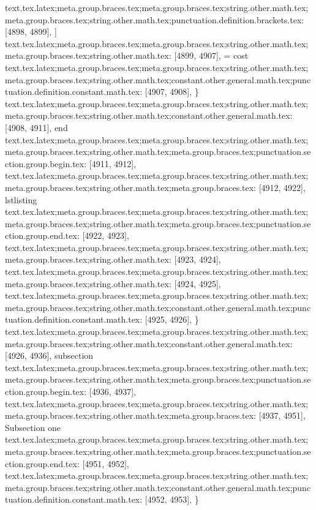 {{{{{{{{{{{{{{{{{{{{{{{{{{{{{{{{{{{{{{{{{{{{{{{{{{{{{{{{{{{{{{{{{{{{{{{{{{{{{{{{{{{{{{{{{{{{{{{{{{{{{{{{{{{{{{{{{{{{{{{{{{{{{{{{{{{{{{{{{{{{{{{{text.tex.latex;meta.group.braces.tex;meta.group.braces.tex;string.other.math.tex;meta.group.braces.tex;string.other.math.tex;punctuation.definition.brackets.tex: [4898, 4899], {]}
text.tex.latex;meta.group.braces.tex;meta.group.braces.tex;string.other.math.tex;meta.group.braces.tex;string.other.math.tex: [4899, 4907], { = cost
}
text.tex.latex;meta.group.braces.tex;meta.group.braces.tex;string.other.math.tex;meta.group.braces.tex;string.other.math.tex;constant.other.general.math.tex;punctuation.definition.constant.math.tex: [4907, 4908], {\}
text.tex.latex;meta.group.braces.tex;meta.group.braces.tex;string.other.math.tex;meta.group.braces.tex;string.other.math.tex;constant.other.general.math.tex: [4908, 4911], {end}
text.tex.latex;meta.group.braces.tex;meta.group.braces.tex;string.other.math.tex;meta.group.braces.tex;string.other.math.tex;meta.group.braces.tex;punctuation.section.group.begin.tex: [4911, 4912], {{}
text.tex.latex;meta.group.braces.tex;meta.group.braces.tex;string.other.math.tex;meta.group.braces.tex;string.other.math.tex;meta.group.braces.tex: [4912, 4922], {lstlisting}
text.tex.latex;meta.group.braces.tex;meta.group.braces.tex;string.other.math.tex;meta.group.braces.tex;string.other.math.tex;meta.group.braces.tex;punctuation.section.group.end.tex: [4922, 4923], {}}
text.tex.latex;meta.group.braces.tex;meta.group.braces.tex;string.other.math.tex;meta.group.braces.tex;string.other.math.tex: [4923, 4924], {
}
text.tex.latex;meta.group.braces.tex;meta.group.braces.tex;string.other.math.tex;meta.group.braces.tex;string.other.math.tex: [4924, 4925], {
}
text.tex.latex;meta.group.braces.tex;meta.group.braces.tex;string.other.math.tex;meta.group.braces.tex;string.other.math.tex;constant.other.general.math.tex;punctuation.definition.constant.math.tex: [4925, 4926], {\}
text.tex.latex;meta.group.braces.tex;meta.group.braces.tex;string.other.math.tex;meta.group.braces.tex;string.other.math.tex;constant.other.general.math.tex: [4926, 4936], {subsection}
text.tex.latex;meta.group.braces.tex;meta.group.braces.tex;string.other.math.tex;meta.group.braces.tex;string.other.math.tex;meta.group.braces.tex;punctuation.section.group.begin.tex: [4936, 4937], {{}
text.tex.latex;meta.group.braces.tex;meta.group.braces.tex;string.other.math.tex;meta.group.braces.tex;string.other.math.tex;meta.group.braces.tex: [4937, 4951], {Subsection one}
text.tex.latex;meta.group.braces.tex;meta.group.braces.tex;string.other.math.tex;meta.group.braces.tex;string.other.math.tex;meta.group.braces.tex;punctuation.section.group.end.tex: [4951, 4952], {}}
text.tex.latex;meta.group.braces.tex;meta.group.braces.tex;string.other.math.tex;meta.group.braces.tex;string.other.math.tex;constant.other.general.math.tex;punctuation.definition.constant.math.tex: [4952, 4953], {\}
}}}}}}}}}}}}}}}}}}}}}}}}}}}}}}}}}}}}}}}}}}}}}}}}}}}}}}}}}}}}}}}}}}}}}}}}}}}}}}}}}}}}}}}}}}}}}}}}}}}}}}}}}}}}}}}}}}}}}}}}}}}}}}}}}}}}}}}}}}}}}}}}}}}
